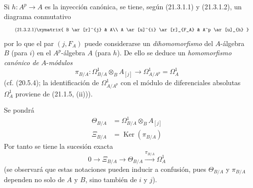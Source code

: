 \begin{env}[21.3.2]
\label{0.21.3.2-fr}
Si $h:A^p\to A$ es la inyección canónica, se tiene, según (21.3.1.1) y
(21.3.1.2), un diagrama conmutativo
\begin{equation}
\tag{21.3.2.1}\label{0.21.3.2.1-fr}
\xymatrix{
 B \ar[r]^{j} & A\\
 A \ar[u]^{i} \ar[r]_{F_A} & A^p \ar[u]_{h}
}
\end{equation}
por lo que el par $(j,F_A)$ puede considerarse un \emph{dihomomorfismo} del
$A$-álgebra $B$ (para $i$) en el $A^p$-álgebra $A$ (para $h$).
De ello se deduce un \emph{homomorfismo canónico de} $A$-\emph{módulos}
\begin{equation}
\tag{21.3.2.2}\label{0.21.3.2.2-fr}
\pi_{B/A}:\Omega^1_{B/A}\otimes_B A_{[j]}\longrightarrow
\Omega^1_{A/A^p}=\Omega^1_A
\end{equation}
(cf. (20.5.4); la identificación de $\Omega^1_{A/A^p}$ con el módulo de
diferenciales absolutas $\Omega^1_A$ proviene de (21.1.5, (ii))).

Se pondrá
\begin{align}
\tag{21.3.2.3}\label{0.21.3.2.3-fr}
\Theta_{B/A}&=\Omega^1_{B/A}\otimes_B A_{[j]}\\
\tag{21.3.2.4}\label{0.21.3.2.4-fr}
\Xi_{B/A}&=\operatorname{Ker}(\pi_{B/A})
\end{align}
Por tanto se tiene la sucesión exacta
\begin{equation}
\tag{21.3.2.5}\label{0.21.3.2.5-fr}
0\to\Xi_{B/A}\to\Theta_{B/A}\xrightarrow{\pi_{B/A}}\Omega^1_A
\end{equation}
(se observará que estas notaciones pueden inducir a confusión, pues
$\Theta_{B/A}$ y $\pi_{B/A}$ dependen no solo de $A$ y $B$, sino también de
$i$ y $j$).
\end{env}

